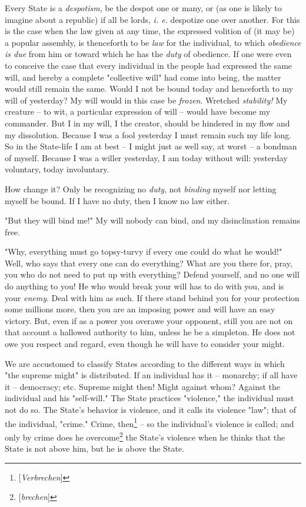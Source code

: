 Every State is a \textit{despotism}, be the despot one or many, or (as one is 
likely to imagine about a republic) if all be lords, \textit{i. e.} despotize 
one over another. For this is the case when the law given at any time, the 
expressed volition of (it may be) a popular assembly, is thenceforth to be 
\textit{law} for the individual, to which \textit{obedience is due} from him 
or toward which he has the \textit{duty} of obedience. If one were even to 
conceive the case that every individual in the people had expressed the same 
will, and hereby a complete "{}collective will"{} had come into being, the 
matter would still remain the same. Would I not be bound today and henceforth 
to my will of yesterday? My will would in this case be \textit{frozen}. 
Wretched \textit{stability!} My creature -- to wit, a particular expression of 
will -- would have become my commander. But I in my will, I the creator, 
should be hindered in my flow and my dissolution. Because I was a fool 
yesterday I must remain such my life long. So in the State-life I am at best 
-- I might just as well say, at worst -- a bondman of myself. Because I was a 
willer yesterday, I am today without will: yesterday voluntary, today 
involuntary.

How change it? Only be recognizing no \textit{duty}, not \textit{binding} 
myself nor letting myself be bound. If I have no duty, then I know no law 
either.

"{}But they will bind me!"{} My will nobody can bind, and my disinclination 
remains free.

"{}Why, everything must go topsy-turvy if every one could do what he would!"{} 
Well, who says that every one can do everything? What are you there for, pray, 
you who do not need to put up with everything? Defend yourself, and no one 
will do anything to you! He who would break your will has to do with you, and 
is your \textit{enemy}. Deal with him as such. If there stand behind you for 
your protection some millions more, then you are an imposing power and will 
have an easy victory. But, even if as a power you overawe your opponent, still 
you are not on that account a hallowed authority to him, unless he be a 
simpleton. He does not owe you respect and regard, even though he will have to 
consider your might.

We are accustomed to classify States according to the different ways in which 
"{}the supreme might"{} is distributed. If an individual has it -- monarchy; 
if all have it -- democracy; etc. Supreme might then! Might against whom? 
Against the individual and his "{}self-will."{} The State practices 
"{}violence,"{} the individual must not do so. The State's behavior is 
violence, and it calls its violence "{}law"{}; that of the individual, 
"{}crime."{} Crime, then\footnote{[\textit{Verbrechen}]} -- so the 
individual's violence is called; and only by crime does he 
overcome\footnote{[\textit{brechen}]} the State's violence when he thinks that 
the State is not above him, but he is above the State.

